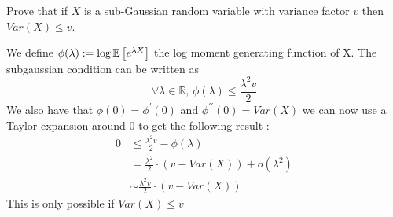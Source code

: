 \begin{exercise}[]{}
	Prove that if $ X $ is a sub-Gaussian random variable with variance factor $ v $ then $ Var(X) \leq v $.
\end{exercise}

\begin{solution}[]
	We define $ \phi(\lambda) := \log \mathbb{E}\left[e^{\lambda X}\right] $ the log moment generating function of X. The subgaussian condition can be written as
\begin{equation*}
	\forall \lambda \in \mathbb{R},\, \phi(\lambda) \leq \frac{\lambda^2v}{2}
\end{equation*}
We also have that $ \phi(0) = \phi^{\prime}(0) $ and $ \phi^{\prime\prime}(0) = Var(X) $ we can now use a Taylor expansion around 0 to get the following result :
\begin{align*}
	0 &\leq \frac{\lambda^2v}{2} - \phi(\lambda) \\
	  &=\frac{\lambda^2}{2}\cdot (v-Var(X)) + o(\lambda^2) \\
	  &\sim \frac{\lambda^2v}{2}\cdot (v-Var(X))
\end{align*}
This is only possible if $ Var(X) \leq v $

\end{solution}
